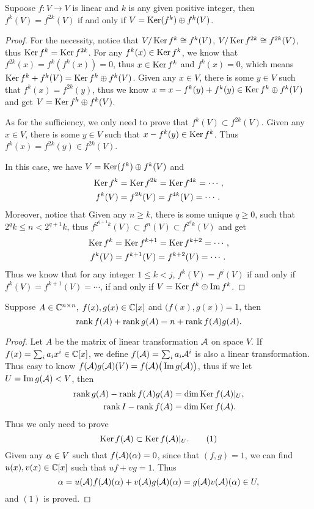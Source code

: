 \begin{pro}%
	Supoose $f\colon V\to V$ is linear and $k$ is any given positive integer, then $f^k(V)=f^{2k}(V)$ if and only if $V=\operatorname*{Ker}(f^k)\oplus f^k(V)$.
\end{pro}
\begin{proof}
	For the necessity, notice that $V/\operatorname*{Ker}{f^k}\cong f^k(V)$, $V/\operatorname*{Ker}{f^{2k}}\cong f^{2k}(V)$, thus $\operatorname*{Ker} f^k=\operatorname*{Ker} f^{2k}$. For any $f^k(x)\in \operatorname*{Ker}{f^k}$, we know that $f^{2k}(x)=f^k(f^k(x))=0$, thus $x\in \operatorname*{Ker} f^k$ and $f^k(x)=0$, which means $\operatorname*{Ker} f^k+f^k(V)=\operatorname*{Ker} f^k\oplus f^k(V)$. Given any $x\in V$, there is some $y\in V$ such that $f^k(x)=f^{2k}(y)$, thus we know $x=x-f^k(y)+f^k(y)\in \operatorname*{Ker} f^k\oplus f^k(V)$ and get $V=\operatorname*{Ker} f^k\oplus f^k(V)$. 

	As for the sufficiency, we only need to prove that $f^k(V)\subset f^{2k}(V)$. Given any $x\in V$, there is some $y\in V$ such that $x-f^k(y)\in\operatorname*{Ker} f^k$. Thus $f^k(x)=f^{2k}(y)\in f^{2k}(V)$.

	In this case, we have $V=\operatorname*{Ker} (f^k)\oplus f^k(V)$ and
	\begin{align*}
	\operatorname*{Ker} f^k&=\operatorname*{Ker} f^{2k}=\operatorname*{Ker} f^{4k}=\cdots,\\
	f^k(V)&=f^{2k}(V)=f^{4k}(V)=\cdots.
	\end{align*}
	Moreover, notice that Given any $n\geq k$, there is some unique $q\geq 0$, such that $2^qk\leq n<2^{q+1} k$, thus
	$f^{2^{q+1} k}(V)\subset f^n(V)\subset f^{2^q k}(V)$ and get
	\begin{align*}
	\operatorname*{Ker} f^k&=\operatorname*{Ker} f^{k+1}=\operatorname*{Ker} f^{k+2}=\cdots,\\
	f^k(V)&=f^{k+1}(V)=f^{k+2}(V)=\cdots.
	\end{align*}
	Thus we know that for any integer $1\leq k< j$, $f^k(V)=f^j(V)$ if and only if $f^k(V)=f^{k+1}(V)=\cdots$, if and only if $V=\operatorname*{Ker} f^k\oplus \operatorname*{Im} f^k$.
	\end{proof}

\begin{pro}%
	Suppose $A\in\mathbb{C}^{n\times n},\;f(x),g(x)\in\mathbb{C}[x]$ and $\big(f(x),g(x)\big)=1$, then
	\[\operatorname*{rank} f(A)+\operatorname*{rank} g(A)=n+\operatorname*{rank} f(A)g(A).\]
\end{pro}
\begin{proof}
	Let $A$ be the matrix of linear transformation $\mathcal{A}$ on space $V$. If $f(x)=\sum_i a_i x^i\in\mathbb{C}[x]$, we define $f(\mathcal{A})=\sum_i a_i \mathcal{A}^i$ is also a linear transformation. Thus easy to know $f(\mathcal{A})g(\mathcal{A})(V)=f(\mathcal{A})\big(\operatorname*{Im} g(\mathcal{A})\big)$, thus if we let $U=\operatorname*{Im} g(\mathcal{A})<V$, then
	\begin{align*}
	\operatorname*{rank} g(A)-\operatorname*{rank} f(A)g(A)&=\dim\operatorname*{Ker} f(\mathcal{A})|_U,\\
	\operatorname*{rank} I-\operatorname*{rank} f(A)&=\dim\operatorname*{Ker} f(\mathcal{A}).
	\end{align*}
	Thus we only need to prove 
	\[\operatorname*{Ker} f(\mathcal{A})\subset \operatorname*{Ker} f(\mathcal{A})|_U.\tag{1}\]
	Given any $\alpha\in V$ such that $f(\mathcal{A})(\alpha)=0$, since that $(f,g)=1$, we can find $u(x),v(x)\in \mathbb{C}[x]$ such that $uf+vg=1$. Thus
	\[\alpha=u(\mathcal{A})f(\mathcal{A})(\alpha)+v(\mathcal{A})g(\mathcal{A})(\alpha)=g(\mathcal{A})v(\mathcal{A})(\alpha)\in U,\]
	and $(1)$ is proved. 
\end{proof}

